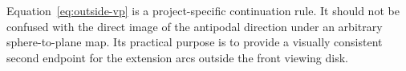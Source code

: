 Equation~\eqref{eq:outside-vp} is a project-specific continuation rule.  It should not be confused with the direct image of the antipodal direction under an arbitrary sphere-to-plane map.  Its practical purpose is to provide a visually consistent second endpoint for the extension arcs outside the front viewing disk.
